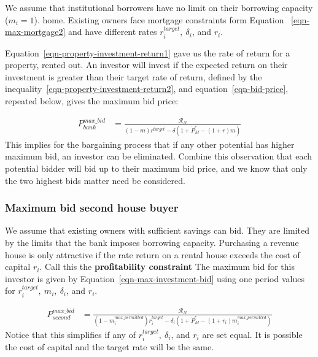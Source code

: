 We assume that institutional borrowers have no limit on their borrowing capacity ($m_i=1$). home. Existing owners face mortgage constraints form Equation ~\ref{eqn-max-mortgage2} and have different rates $r_i^{target},\ \delta_i$, and $r_i$.

Equation~\ref{eqn-property-investment-return1} gave us the rate of return for a property, rented out. An investor will invest if the expected return on their investment is greater than their target rate of return, %
defined by the inequality~\ref{eqn-property-investment-return2}, and equation~\ref{eqn-bid-price}, repeated below, gives the maximum bid price:

\begin{eqnarray}\label{eqn-max-investment-bid}
P_{bank}^{max\_bid} & = \frac{\mathcal{R}_N}{(1-m)r^{target}-\delta \left(1 + \dot P_M^e - (1+r)m\right)} 
\end{eqnarray}
This implies for the bargaining process that if any other potential  has  higher maximum bid, an investor can be eliminated. Combine this observation that each potential bidder will bid up to their maximum bid price, and we know that only the two highest bids matter need be considered.  



\subsubsection{Maximum bid second house buyer}

We assume that existing owners with sufficient savings can bid. They are limited by the limits  that the bank imposes  borrowing capacity.   Purchasing a revenue house is only attractive if the rate return on a rental house exceeds the cost of capital $r_i$. Call this the \textbf{profitability constraint} The maximum bid for this investor is given by Equation~\ref{eqn-max-investment-bid} using one period values for $r_i^{target},\ m_i,\ \delta_i$, and $r_i$.

 \begin{eqnarray}\label{eqn-max-second-bid}
P_{second}^{max\_bid} & = \frac{\mathcal{R}_N}{(1-m_i^{max\_permitted})r_i^{target}-\delta_i \left(1 + \dot P_M^e - (1+r_i)m_i^{max\_permitted}\right)} 
\end{eqnarray}
Notice that this simplifies if any of $r_i^{target},\ \delta_i$, and $r_i$ are set equal. It is possible the cost of capital and the target rate will be the same.

